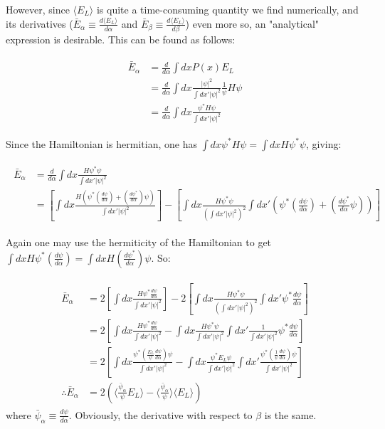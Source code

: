 \documentclass[english, a4paper]{article}
\begin{document}
	 However, since $\langle E_L\rangle$ is quite a time-consuming quantity we find numerically, and its derivatives ($\bar{E}_\alpha \equiv \frac{d\langle E_L\rangle}{d\alpha}$ and $\bar{E}_\beta \equiv \frac{d\langle E_L\rangle}{d\beta}$) even more so, an "analytical" expression is desirable. This can be found as follows:
	
	\begin{align}
	\begin{split}
	\bar{E}_\alpha &= \frac{d}{d\alpha}\int dx P(x) E_L\\
	&= \frac{d}{d\alpha}\int dx \frac{|\psi|^2}{\int dx'|\psi|^2}\frac{1}{\psi}H\psi\\
	&= \frac{d}{d\alpha}\int dx \frac{\psi^*H\psi}{\int dx'|\psi|^2}
	\end{split}
	\end{align}
	
	Since the Hamiltonian is hermitian, one has $\int dx\psi^* H \psi = \int dx H\psi^*\psi$, giving:
	
	\begin{align}
	\begin{split}
	\bar{E}_\alpha &= \frac{d}{d\alpha}\int dx \frac{H\psi^*\psi}{\int dx'|\psi|^2}\\
	&= \left[ \int dx\frac{H\left(\psi^*\left(\frac{d\psi}{d\alpha}\right) + \left(\frac{d\psi^*}{d\alpha}\right)\psi\right)}{\int dx'|\psi|^2} \right] - \left[ \int dx \frac{H\psi^*\psi}{\left(\int dx'|\psi|^2\right)^2}\int dx'\left( \psi^*\left(\frac{d\psi}{d\alpha}\right) + \left(\frac{d\psi^*}{d\alpha}\psi\right) \right) \right]
	\end{split}
	\end{align}
	
	Again one may use the hermiticity of the Hamiltonian to get $\int dx H \psi^*\left(\frac{d\psi}{d\alpha}\right) = \int dx H \left(\frac{d\psi^*}{d\alpha}\right)\psi$. So:
	
	\begin{align}
	\begin{split}
	\bar{E}_\alpha &= 2\left[ \int dx\frac{H\psi^*\frac{d\psi}{d\alpha}}{\int dx'|\psi|^2} \right] - 2\left[ \int dx \frac{H\psi^*\psi}{\left(\int dx'|\psi|^2\right)^2}\int dx' \psi^*\frac{d\psi}{d\alpha} \right]\\
	&= 2\left[ \int dx\frac{H\psi^*\frac{d\psi}{d\alpha}}{\int dx'|\psi|^2} - \int dx \frac{H\psi^*\psi}{\int dx'|\psi|^2}\int dx' \frac{1}{\int dx'|\psi|^2}\psi^*\frac{d\psi}{d\alpha} \right]\\
	&= 2\left[ \int dx\frac{\psi^*\left(\frac{E_L}{\psi}\frac{d\psi}{d\alpha}\right) \psi}{\int dx'|\psi|^2} - \int dx \frac{\psi^* E_L\psi}{\int dx'|\psi|^2}\int dx' \frac{\psi^*\left(\frac{1}{\psi}\frac{d\psi}{d\alpha}\right)\psi}{\int dx'|\psi|^2} \right]\\
	\therefore \bar{E}_\alpha &= 2\left( \langle\frac{\bar{\psi}_\alpha}{\psi}E_L\rangle -  \langle\frac{\bar{\psi}_\alpha}{\psi}\rangle\langle E_L\rangle \right)
	\end{split}
	\end{align}
	where $\bar{\psi}_\alpha \equiv \frac{d\psi}{d\alpha}$. Obviously, the derivative with respect to $\beta$ is the same.
	
\end{document}
